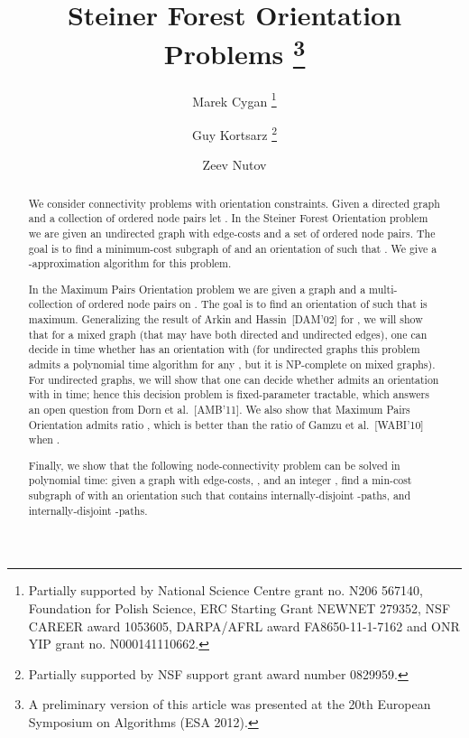 \documentclass[envcountsame]{llncs}
\begin{document}
\title{Steiner Forest Orientation Problems \thanks{A preliminary version of this article was presented at the 20th European Symposium on Algorithms (ESA 2012).}}

\author{Marek Cygan
 \thanks{Partially supported by National Science Centre grant no. N206 567140, Foundation for Polish Science, ERC Starting Grant NEWNET 279352, NSF CAREER award 1053605, DARPA/AFRL award FA8650-11-1-7162 and ONR YIP grant no. N000141110662.}
\and 
Guy Kortsarz \thanks{Partially supported by NSF support grant award number 0829959.}
\and 
Zeev Nutov
        }



\maketitle

\newcommand {\ignore} [1] {}


\newcommand{\cur}{{\rm cur}}

\begin{abstract}
We consider connectivity problems with orientation constra\-ints.
Given a directed graph  and a collection of ordered node pairs 
let .
In the {\sf Steiner Forest Orientation} problem we are given  
an undirected graph  with edge-costs and a set  of ordered node pairs. 
The goal is to find a minimum-cost subgraph  of  and an orientation  of  
such that . We give a -approximation algorithm for this problem.

In the {\sf Maximum Pairs Orientation} problem we are given a  
graph  and a multi-collection of ordered node pairs  on .
The goal is to find an orientation  of  such that  is maximum.
Generalizing the result of Arkin and Hassin~[DAM'02] for , we will show that 
for a mixed graph  (that may have both directed and undirected edges),
one can decide in  time whether  has an orientation  with 
(for undirected graphs this problem admits a polynomial time algorithm for any , but it is NP-complete on mixed graphs).
For undirected graphs, we will show that one can decide 
whether  admits an orientation  with  
in  time; hence this decision problem is 
fixed-parameter tractable, which answers an open question from Dorn et al.~[AMB'11].
We also show that {\sf Maximum Pairs Orientation} admits ratio ,
which is better than the ratio  of Gamzu et al.~[WABI'10] when .

Finally, we show that the following node-connectivity problem can be solved in polynomial time:
given a graph  with edge-costs, , and an integer , 
find a min-cost subgraph  of  with an orientation  
such that  contains  internally-disjoint -paths, 
and  internally-disjoint -paths.
\end{abstract}
\end{document}
